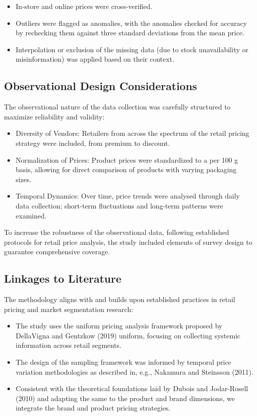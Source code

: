\documentclass[
  letterpaper,
  DIV=11,
  numbers=noendperiod]{scrartcl}
\begin{document}
\begin{itemize}
\item
  In-store and online prices were cross-verified.
\item
  Outliers were flagged as anomalies, with the anomalies checked for
  accuracy by rechecking them against three standard deviations from the
  mean price.
\item
  Interpolation or exclusion of the missing data (due to stock
  unavailability or misinformation) was applied based on their context.
\end{itemize}

\subsection{Observational Design
Considerations}\label{observational-design-considerations}

The observational nature of the data collection was carefully structured
to maximize reliability and validity:

\begin{itemize}
\item
  Diversity of Vendors: Retailers from across the spectrum of the retail
  pricing strategy were included, from premium to discount.
\item
  Normalization of Prices: Product prices were standardized to a per 100
  g basis, allowing for direct comparison of products with varying
  packaging sizes.
\item
  Temporal Dynamics: Over time, price trends were analysed through daily
  data collection; short-term fluctuations and long-term patterns were
  examined.
\end{itemize}

To increase the robustness of the observational data, following
established protocols for retail price analysis, the study included
elements of survey design to guarantee comprehensive coverage.

\subsection{Linkages to Literature}\label{linkages-to-literature}

The methodology aligns with and builds upon established practices in
retail pricing and market segmentation research:

\begin{itemize}
\item
  The study uses the uniform pricing analysis framework proposed by
  DellaVigna and Gentzkow (2019) uniform, focusing on collecting
  systemic information across retail segments.
\item
  The design of the sampling framework was informed by temporal price
  variation methodologies as described in, e.g., Nakamura and Steinsson
  (2011).
\item
  Consistent with the theoretical foundations laid by Dubois and
  Jodar-Rosell (2010) and adapting the same to the product and brand
  dimensions, we integrate the brand and product pricing strategies.
\end{itemize}
\end{document}
